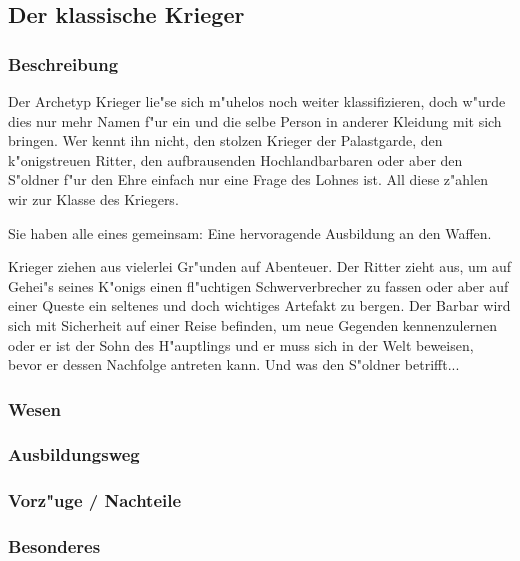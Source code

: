 \subsection{Der klassische Krieger}
\subsubsection{Beschreibung}
\par Der Archetyp Krieger lie"se sich m"uhelos noch weiter klassifizieren, doch w"urde dies 
nur mehr Namen f"ur ein und die selbe Person in anderer Kleidung mit sich bringen.
Wer kennt ihn nicht, den stolzen Krieger der Palastgarde, den k"onigstreuen Ritter, den aufbrausenden 
Hochlandbarbaren oder aber den S"oldner f"ur den Ehre einfach nur eine Frage des Lohnes ist. All diese 
z"ahlen wir zur Klasse des Kriegers.
\par Sie haben alle eines gemeinsam: Eine hervoragende Ausbildung an den Waffen.
\par Krieger ziehen aus vielerlei Gr"unden auf Abenteuer. Der Ritter zieht aus, um auf Gehei"s seines 
K"onigs einen fl"uchtigen Schwerverbrecher zu fassen oder aber auf einer Queste ein seltenes und doch 
wichtiges Artefakt zu bergen. Der Barbar wird sich mit Sicherheit auf einer Reise befinden, um neue 
Gegenden kennenzulernen oder er ist der Sohn des H"auptlings und er muss sich in der Welt beweisen, 
bevor er dessen Nachfolge antreten kann. Und was den S"oldner betrifft...
\subsubsection{Wesen}
\subsubsection{Ausbildungsweg}
\subsubsection{Vorz"uge / Nachteile}
\subsubsection{Besonderes}
